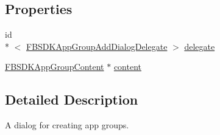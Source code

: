 \subsection*{Properties}
\begin{DoxyCompactItemize}
\item 
id\\*
$<$ \hyperlink{protocol_f_b_s_d_k_app_group_add_dialog_delegate-p}{F\-B\-S\-D\-K\-App\-Group\-Add\-Dialog\-Delegate} $>$ \hyperlink{interface_f_b_s_d_k_app_group_add_dialog_a0a92aa54b858fdf0f62b6d98bc09ab80}{delegate}
\item 
\hyperlink{interface_f_b_s_d_k_app_group_content}{F\-B\-S\-D\-K\-App\-Group\-Content} $\ast$ \hyperlink{interface_f_b_s_d_k_app_group_add_dialog_a2a7109b4320ff393d28fff95e6bff301}{content}
\end{DoxyCompactItemize}


\subsection{Detailed Description}
A dialog for creating app groups. 

